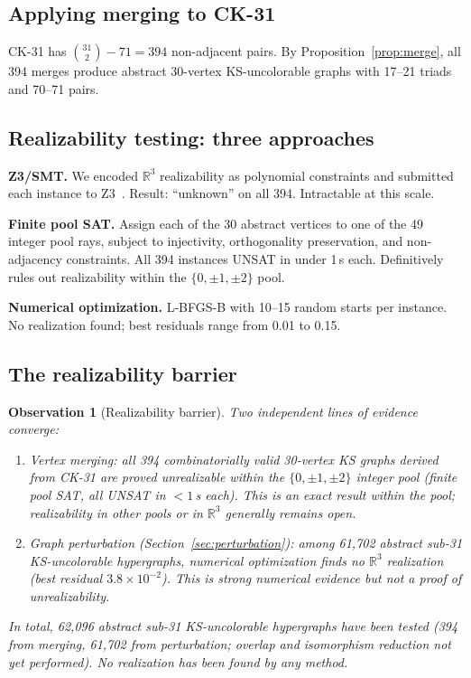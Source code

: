\documentclass[twocolumn,pra,superscriptaddress,nofootinbib]{revtex4-2}
\newtheorem{observation}{Observation}
\newcommand{\R}{\mathbb{R}}
\begin{document}
\subsection{Applying merging to CK-31}

CK-31 has $\binom{31}{2} - 71 = 394$ non-adjacent pairs. By Proposition~\ref{prop:merge}, all 394 merges produce abstract 30-vertex KS-uncolorable graphs with 17--21 triads and 70--71 pairs.

\subsection{Realizability testing: three approaches}

\textbf{Z3/SMT.} We encoded $\R^3$ realizability as polynomial constraints and submitted each instance to Z3~\cite{Z3}. Result: ``unknown'' on all 394. Intractable at this scale.

\textbf{Finite pool SAT.} Assign each of the 30 abstract vertices to one of the 49 integer pool rays, subject to injectivity, orthogonality preservation, and non-adjacency constraints. All 394 instances UNSAT in under 1\,s each. Definitively rules out realizability within the $\{0,\pm1,\pm2\}$ pool.

\textbf{Numerical optimization.} L-BFGS-B with 10--15 random starts per instance. No realization found; best residuals range from 0.01 to 0.15.

\subsection{The realizability barrier}

\begin{observation}[Realizability barrier]
\label{obs:barrier}
Two independent lines of evidence converge:
\begin{enumerate}[label=(\roman*)]
\item \emph{Vertex merging}: all 394 combinatorially valid 30-vertex KS graphs derived from CK-31 are proved unrealizable within the $\{0,\pm1,\pm2\}$ integer pool (finite pool SAT, all UNSAT in $< 1$\,s each). This is an exact result within the pool; realizability in other pools or in $\R^3$ generally remains open.
\item \emph{Graph perturbation} (Section~\ref{sec:perturbation}): among 61,702 abstract sub-31 KS-uncolorable hypergraphs, numerical optimization finds no $\R^3$ realization (best residual $3.8 \times 10^{-2}$). This is strong numerical evidence but not a proof of unrealizability.
\end{enumerate}
In total, 62,096 abstract sub-31 KS-uncolorable hypergraphs have been tested (394 from merging, 61,702 from perturbation; overlap and isomorphism reduction not yet performed). No realization has been found by any method.
\end{observation}
\end{document}
